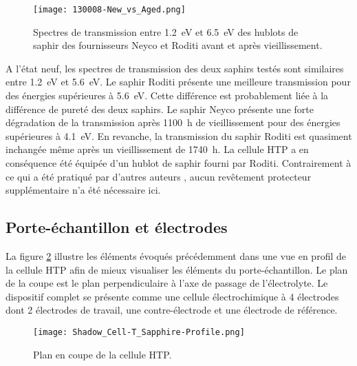 \begin{refsection}
        \begin{figure}[H]
        \centering
            \texttt{[image: 130008-New\_vs\_Aged.png]}
            \caption{Spectres de transmission entre
            \SI{1.2}{\electronvolt} et \SI{6.5}{\electronvolt} des hublots de saphir des fournisseurs Neyco et Roditi avant
            et après vieillissement.}
            \label{fig:comparison_new_aged}
        \end{figure}
        
        A l'état neuf, les spectres de transmission des deux saphirs testés sont similaires entre 
        \SI{1.2}{\electronvolt} et \SI{5.6}{\electronvolt}. Le saphir Roditi présente une meilleure transmission 
        pour des énergies supérieures à \SI{5.6}{\electronvolt}. Cette différence est probablement liée à la différence
        de
        pureté des deux saphirs. Le saphir Neyco présente une forte dégradation de la transmission après \SI{1100}{\hour}
        de vieillissement pour des énergies supérieures à \SI{4.1}{\electronvolt}. En revanche, la transmission
        du saphir Roditi est quasiment inchangée même après un vieillissement de \SI{1740}{\hour}.
        La cellule HTP a en conséquence été équipée d’un hublot de saphir fourni par Roditi.
        Contrairement à ce qui a été pratiqué par d'autres auteurs \citep{Kim2010}, aucun revêtement protecteur
        supplémentaire n'a été nécessaire ici.
       
        
    \subsection{Porte-échantillon et électrodes}\label{subsec:sample_holder_electrodes}

        La figure \ref{fig:Profile_HT_cell} illustre les éléments évoqués précédemment dans une vue en profil 
        de la cellule HTP afin de mieux visualiser les éléments du porte-échantillon. 
        Le plan de la coupe est le plan perpendiculaire à l’axe de passage de l’électrolyte. 
        Le dispositif complet se présente comme une cellule électrochimique à 4 électrodes dont 2 électrodes de travail,
        une contre-électrode et une électrode de référence.

        \begin{figure}[H]
            \centering
            \texttt{[image: Shadow\_Cell-T\_Sapphire-Profile.png]}
            \caption{Plan en coupe de la cellule HTP.}
            \label{fig:Profile_HT_cell}
        \end{figure}



\end{refsection}
